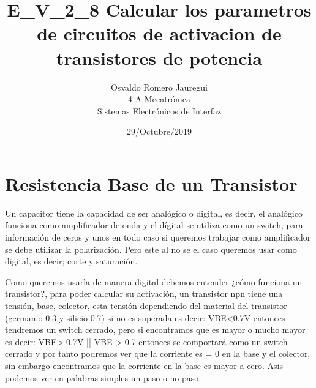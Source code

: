 \documentclass[11pt]{article}
\title{\textbf{E\_V\_2\_8 Calcular los parametros de circuitos de activacion de transistores de potencia}}
\author{Osvaldo Romero Jauregui\\
		4-A Mecatrónica\\
		Sistemas Electrónicos de Interfaz}
\date{29/Octubre/2019}
\begin{document}
\maketitle

\section{Resistencia Base de un Transistor}
Un capacitor tiene la capacidad de ser analógico o digital, es decir, el analógico funciona como amplificador de onda y el dígital se utiliza como un switch, para información de ceros y unos en todo caso si queremos trabajar como amplificador se debe utilizar la polarización. Pero este al no se el caso queremos usar como digital, es decir; corte y saturación.

Como queremos usarla de manera digital debemos entender ¿cómo funciona un transistor?, para poder calcular su activación, un transistor npn tiene una tensión, base, colector, esta tensión dependiendo del material del transistor (germanio 0.3 y silicio 0.7) si no es superada es decir: VBE<0.7V entonces tendremos un switch cerrado, pero si encontramos que es mayor o mucho mayor es decir: VBE> 0.7V || VBE > 0.7 entonces se comportará como un switch cerrado y por tanto podremos ver que la corriente es = 0 en la base y el colector, sin embargo encontramos que la corriente en la base es mayor a cero. Asis podemos ver en palabras simples un paso o no paso.
\end{document}
